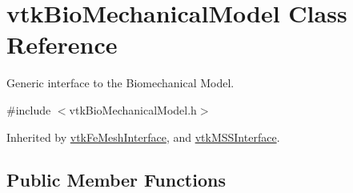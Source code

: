 \hypertarget{classvtkBioMechanicalModel}{
\section{vtkBioMechanicalModel Class Reference}
\label{classvtkBioMechanicalModel}
}


Generic interface to the Biomechanical Model.  


{\ttfamily \#include $<$vtkBioMechanicalModel.h$>$}

Inherited by \hyperlink{classvtkFeMeshInterface}{vtkFeMeshInterface}, and \hyperlink{classvtkMSSInterface}{vtkMSSInterface}.\subsection*{Public Member Functions}
